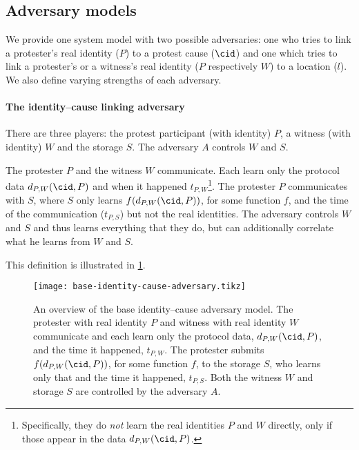 \subsection{Adversary models}%
\label{adversary-model-different-levels}

We provide one system model with two possible adversaries: one who tries to 
link a protester's real identity (\(P\)) to a protest cause (\(\cid\)) and one 
which tries to link a protester's or a witness's real identity (\(P\) 
respectively \(W\)) to a location (\(l\)).
We also define varying strengths of each adversary.

\paragraph{The identity--cause linking adversary}

There are three players: the protest participant (with identity) \(P\), a 
witness (with identity) \(W\) and the storage \(S\).
The adversary \(A\) controls \(W\) and \(S\).

\begin{definition}%
  \label{base-identity-cause-adversary}
  The protester \(P\) and the witness \(W\) communicate.
  Each learn only the protocol data \(d_{P,W}(\cid, P)\) and when it happened 
  \(t_{P,W}\)\footnote{%
    Specifically, they do \emph{not} learn the real identities \(P\) and \(W\) 
    directly, only if those appear in the data \(d_{P,W}(\cid, P)\).
  }.
  The protester \(P\) communicates with \(S\), where \(S\) only learns 
  \(f(d_{P,W}(\cid, P))\), for some function \(f\), and the time of the 
  communication (\(t_{P,S}\)) but not the real identities.
  The adversary controls \(W\) and \(S\) and thus learns everything that they 
  do, but can additionally correlate what he learns from \(W\) and \(S\).
\end{definition}

This definition is illustrated in \cref{fig:identity-cause-adversary}.

\begin{figure}
  \centering
  \texttt{[image: base-identity-cause-adversary.tikz]}
  \caption{\label{fig:identity-cause-adversary}%
    An overview of the base identity--cause adversary model.
    The protester with real identity \(P\) and witness with real identity \(W\) 
    communicate and each learn only the protocol data, \(d_{P,W}(\cid, P)\), 
    and the time it happened, \(t_{P,W}\).
    The protester submits \(f(d_{P,W}(\cid, P))\), for some function \(f\), to 
    the storage \(S\), who learns only that and the time it happened, 
    \(t_{P,S}\).
    Both the witness \(W\) and storage \(S\) are controlled by the adversary 
    \(A\).
  }
\end{figure}

